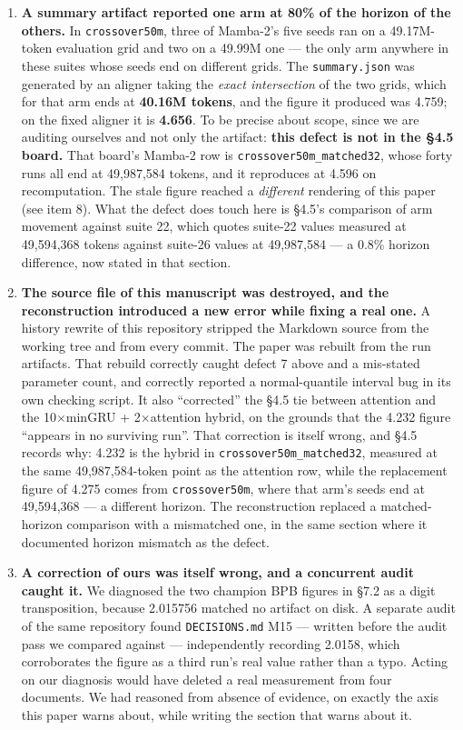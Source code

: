 \begin{enumerate}
  five seeds --- was absent from the document nominally serving as the project's verified record.
\item
  \textbf{A summary artifact reported one arm at 80\% of the horizon of the others.} In
  \texttt{crossover50m}, three of Mamba-2's five seeds ran on a 49.17M-token evaluation grid and two on
  a 49.99M one --- the only arm anywhere in these suites whose seeds end on different grids. The
  \texttt{summary.json} was generated by an aligner taking the \emph{exact intersection} of the two grids,
  which for that arm ends at \textbf{40.16M tokens}, and the figure it produced was 4.759; on the
  fixed aligner it is \textbf{4.656}. To be precise about scope, since we are auditing ourselves and
  not only the artifact: \textbf{this defect is not in the \S4.5 board.} That board's Mamba-2 row is
  \texttt{crossover50m\_matched32}, whose forty runs all end at 49,987,584 tokens, and it reproduces at
  4.596 on recomputation. The stale figure reached a \emph{different} rendering of this paper (see
  item 8). What the defect does touch here is \S4.5's comparison of arm movement against suite 22,
  which quotes suite-22 values measured at 49,594,368 tokens against suite-26 values at
  49,987,584 --- a 0.8\% horizon difference, now stated in that section.
\item
  \textbf{The source file of this manuscript was destroyed, and the reconstruction introduced a new
  error while fixing a real one.} A history rewrite of this repository stripped the Markdown
  source from the working tree and from every commit. The paper was rebuilt from the run
  artifacts. That rebuild correctly caught defect 7 above and a mis-stated parameter count, and
  correctly reported a normal-quantile interval bug in its own checking script. It also
  ``corrected'' the \S4.5 tie between attention and the 10$\times$minGRU + 2$\times$attention hybrid, on the
  grounds that the 4.232 figure ``appears in no surviving run''. That correction is itself wrong,
  and \S4.5 records why: 4.232 is the hybrid in \texttt{crossover50m\_matched32}, measured at the same
  49,987,584-token point as the attention row, while the replacement figure of 4.275 comes from
  \texttt{crossover50m}, where that arm's seeds end at 49,594,368 --- a different horizon. The
  reconstruction replaced a matched-horizon comparison with a mismatched one, in the same section
  where it documented horizon mismatch as the defect.
\item
  \textbf{A correction of ours was itself wrong, and a concurrent audit caught it.} We diagnosed the
  two champion BPB figures in \S7.2 as a digit transposition, because 2.015756 matched no artifact
  on disk. A separate audit of the same repository found \texttt{DECISIONS.md} M15 --- written before the
  audit pass we compared against --- independently recording 2.0158, which corroborates the figure
  as a third run's real value rather than a typo. Acting on our diagnosis would have deleted a
  real measurement from four documents. We had reasoned from absence of evidence, on exactly the
  axis this paper warns about, while writing the section that warns about it.
\end{enumerate}


